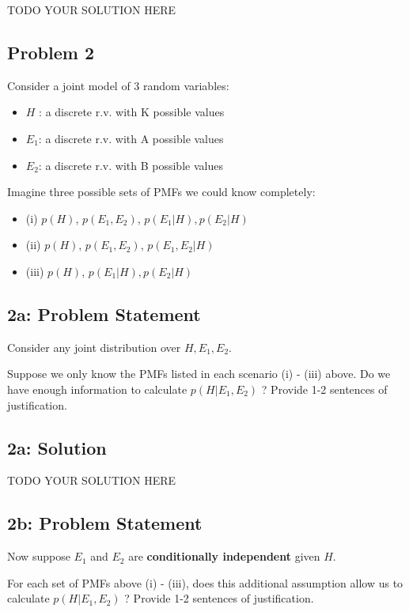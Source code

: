 \documentclass[10pt]{article}
\newcommand{\officialdirections}[1]{{\color{purple} #1}}
\begin{document}
TODO YOUR SOLUTION HERE

\officialdirections{
\subsection*{Problem 2}

Consider a joint model of 3 random variables:

\begin{itemize}
\item $H$ : a discrete r.v. with K possible values
\item $E_1$: a discrete r.v. with A possible values
\item $E_2$: a discrete r.v. with B possible values
\end{itemize}

Imagine three possible sets of PMFs we could know completely:

\begin{itemize}
\item (i) $p(H)$, $p(E_1, E_2)$, $p(E_1|H), p(E_2|H)$
\item (ii) $p(H)$, $p(E_1, E_2)$, $p(E_1, E_2|H)$
\item (iii) $p(H)$, $p(E_1|H), p(E_2|H)$
\end{itemize}
}

\officialdirections{
\subsection*{2a: Problem Statement}
Consider any joint distribution over $H, E_1, E_2$.

Suppose we only know the PMFs listed in each scenario (i) - (iii) above. Do we have enough information to calculate $p(H | E_1, E_2)$ ? Provide 1-2 sentences of justification.
}

\subsection{2a: Solution}
TODO YOUR SOLUTION HERE

\officialdirections{
\subsection*{2b: Problem Statement}
Now suppose $E_1$ and $E_2$ are \textbf{conditionally independent} given $H$.

For each set of PMFs above (i) - (iii), does this additional assumption allow us to calculate $p(H | E_1, E_2)$ ? Provide 1-2 sentences of justification.
}
\end{document}
